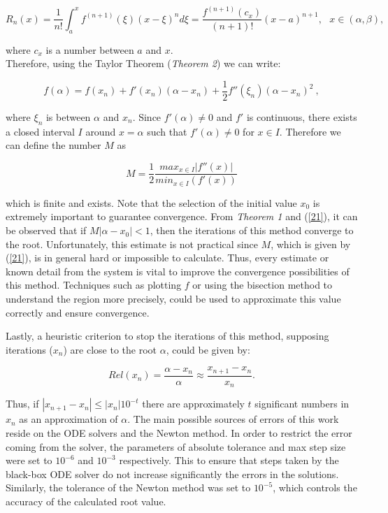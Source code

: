 \documentclass{article}
\begin{document}
    \begin{equation}\label{19}
        R_n(x) = \frac{1}{n!} \int_{a}^{x} f^(n+1)(\xi)(x-\xi)^n d\xi = \frac{f^(n+1)(c_x)}{(n+1)!}(x-a)^{n+1}, \ \ \ x \in (\alpha, \beta),
    \end{equation}

\noindent where $c_x$ is a number between $a$ and $x$. \\

Therefore, using the Taylor Theorem (\textit{Theorem 2}) we can write:

    \begin{equation}\label{20}
        f(\alpha) = f(x_n) + f'(x_n)(\alpha - x_n) + \frac{1}{2} f''(\xi_n)(\alpha - x_n)^2 \ ,
    \end{equation}

where $\xi_n$ is between $\alpha$ and $x_n$. Since $f'(\alpha) \neq 0$ and $f'$ is continuous, there exists a closed interval $I$ around $x=\alpha$ such that $f'(\alpha) \neq 0$ for $x \in I$. Therefore we can define the number $M$ as

    \begin{equation}\label{21}
        M = \frac{1}{2} \frac{max_{x \in I}|f''(x)|}{min_{x \in I}(f'(x))}
    \end{equation}

which is finite and exists. Note that the selection of the initial value $x_0$ is extremely important to guarantee convergence. From \textit{Theorem 1} and (\ref{21}), it can be observed that if $M|\alpha - x_0| < 1$, then the iterations of this method converge to the root. Unfortunately, this estimate is not practical since $M$, which is given by (\ref{21}), is in general hard or impossible to calculate. Thus, every estimate or known detail from the system is vital to improve the convergence possibilities of this method. Techniques such as plotting $f$ or using the bisection method to understand the region more precisely, could be used to approximate this value correctly and ensure convergence. 

Lastly, a heuristic criterion to stop the iterations of this method, supposing iterations ($x_n$) are close to the root $\alpha$, could be given by:

    \begin{equation}\label{22}
        Rel(x_n) = \frac{\alpha - x_n}{\alpha} \approx \frac{x_{n+1} - x_n}{x_n}.
    \end{equation}

Thus, if $|x_{n+1} - x_n| \leq |x_n|10^{-t}$ there are approximately $t$ significant numbers in $x_n$ as an approximation of $\alpha$. The main possible sources of errors of this work reside on the ODE solvers and the Newton method. In order to restrict the error coming from the solver, the parameters of absolute tolerance and max step size were set to $10^{-6}$ and $10^{-3}$ respectively. This to ensure that steps taken by the black-box ODE solver do not increase significantly the errors in the solutions. Similarly, the tolerance of the Newton method was set to $10^{-5}$, which controls the accuracy of the calculated root value. 
\end{document}
